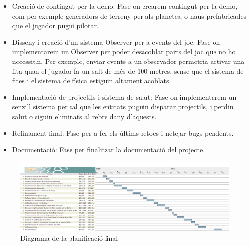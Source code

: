 \begin{itemize}
  \item{Creació de contingut per la demo: }Fase on crearem contingut per la demo, com per exemple generadors de terreny per als planetes, o naus prefabricades que el jugador pugui pilotar.
  \item{Disseny i creació d'un sistema Observer per a events del joc: }Fase on implementarem un Observer per poder desacoblar parts del joc que no ho necessitin. Per exemple, enviar events a un observador permetria activar una fita quan el jugador fa un salt de més de 100 metres, sense que el sistema de fites i el sistema de física estiguin altament acoblats.
  \item{Implementació de projectils i sistema de salut: }Fase on implementarem un senzill sistema per tal que les entitats puguin disparar projectils, i perdin salut o siguin eliminats al rebre dany d'aquests.
  \item{Refinament final: }Fase per a fer els últims retocs i netejar bugs pendents.
  \item{Documentació: }Fase per finalitzar la documentació del projecte.
\end{itemize}
\begin{figure}[H]
  \centering
  \includegraphics[angle=90,origin=c,scale=0.4]{img/novaPlanificacio}
  \caption{Diagrama de la planificació final}
\end{figure}

